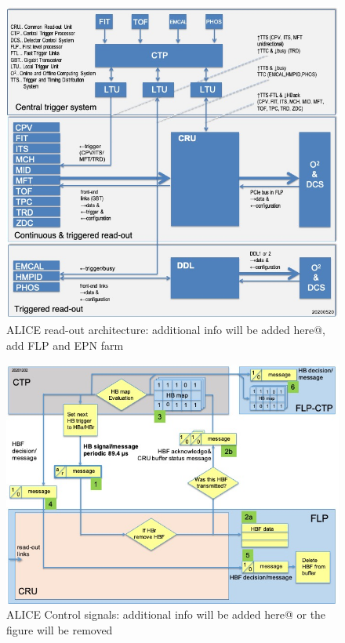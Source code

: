 \begin{figure}[hbtp]
  \begin{center}
    \includegraphics[width=1.\textwidth]{../fig/cru/ro_architecture.jpg}
  \end{center}
  \caption{ALICE read-out architecture: additional info will be added here@, add FLP and EPN farm}
  \label{fig_ro:ro_architecture}
\end{figure}

\begin{figure}[hbtp]
  \begin{center}
    \includegraphics[width=1.\textwidth]{../fig/cru/control_signals.jpg}
  \end{center}
  \caption{ALICE Control signals: additional info will be added here@ or the figure will be removed}
  \label{fig_ro:control_signals}
\end{figure}



